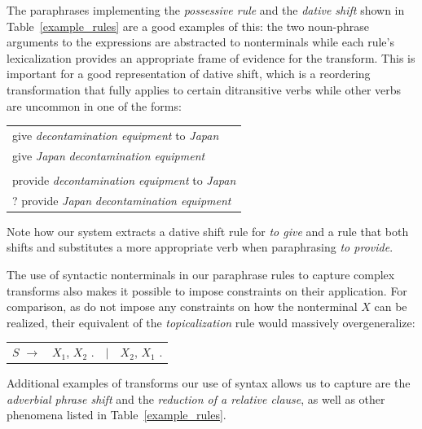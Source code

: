 \documentclass[11pt]{article}
\begin{document}
The paraphrases implementing the \emph{possessive rule} and the
\emph{dative shift} shown in Table~\ref{example_rules} are a good
examples of this: the two noun-phrase arguments to the expressions are
abstracted to nonterminals while each rule's lexicalization provides an
appropriate frame of evidence for the transform. This is important for
a good representation of dative shift, which is a reordering
transformation that fully applies to certain ditransitive verbs while
other verbs are uncommon in one of the forms:
\begin{center}
\begin{tabular}{l}
  give \emph{decontamination equipment} to \emph{Japan} \\
  give \emph{Japan} \emph{decontamination equipment} \\
  \vspace{-10pt}\\
  provide \emph{decontamination equipment} to \emph{Japan} \\
  ? provide \emph{Japan} \emph{decontamination equipment} \\
\end{tabular}
\end{center}
Note how our system extracts a dative shift rule for \emph{to give}
and a rule that both shifts and substitutes a more appropriate verb
when paraphrasing \emph{to provide}.

The use of syntactic nonterminals in our paraphrase rules to capture
complex transforms also makes it possible to impose constraints on
their application. For comparison, as  do not
impose any constraints on how the nonterminal $X$ can be realized,
their equivalent of the \emph{topicalization} rule would massively
overgeneralize:
\begin{center}
\begin{tabular}{rrcl}
  $\mathit{S}$ $\rightarrow$ & $\mathit{X}_1$,
  $\mathit{X}_2$ . & $\mid$ & $\mathit{X}_2$, $\mathit{X}_1$ . \\
\end{tabular}
\end{center}
Additional examples of transforms our use of syntax allows us to
capture are the \emph{adverbial phrase shift} and the \emph{reduction of
  a relative clause}, as well as other phenomena listed in
Table~\ref{example_rules}.
 
\end{document}
